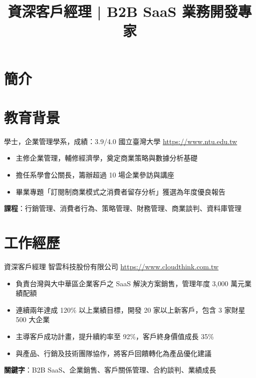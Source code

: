 \documentclass[a4paper, serif, 10pt]{moderncv}
\title{資深客戶經理 | B2B SaaS 業務開發專家}
\begin{document}
\maketitle

\section{簡介}

\section{教育背景}

        {學士，企業管理學系，成績：3.9/4.0}
        {國立臺灣大學}
        {\url{https://www.ntu.edu.tw}}
        {}
        {\begin{itemize}
\item 主修企業管理，輔修經濟學，奠定商業策略與數據分析基礎
\item 擔任系學會公關長，籌辦超過 10 場企業參訪與講座
\item 畢業專題「訂閱制商業模式之消費者留存分析」獲選為年度優良報告
\end{itemize}
\textbf{課程}：行銷管理、消費者行為、策略管理、財務管理、商業談判、資料庫管理}
\section{工作經歷}

        {資深客戶經理}
        {智雲科技股份有限公司}
        {\url{https://www.cloudthink.com.tw}}
        {}
        {\begin{itemize}
\item 負責台灣與大中華區企業客戶之 SaaS 解決方案銷售，管理年度 3,000 萬元業績配額
\item 連續兩年達成 120\% 以上業績目標，開發 20 家以上新客戶，包含 3 家財星 500 大企業
\item 主導客戶成功計畫，提升續約率至 92\%，客戶終身價值成長 35\%
\item 與產品、行銷及技術團隊協作，將客戶回饋轉化為產品優化建議
\end{itemize}
\textbf{關鍵字}：B2B SaaS、企業銷售、客戶關係管理、合約談判、業績成長}
\end{document}
